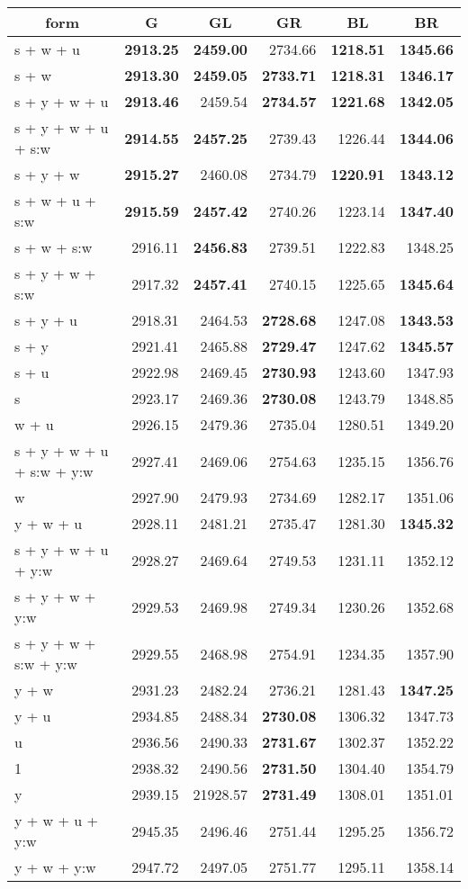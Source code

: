 %
\begin{table}[!tbp]
\begin{center}
\begin{tabular}{lrrrrr}
\hline\hline
\multicolumn{1}{c}{form}&\multicolumn{1}{c}{G}&\multicolumn{1}{c}{GL}&\multicolumn{1}{c}{GR}&\multicolumn{1}{c}{BL}&\multicolumn{1}{c}{BR}\tabularnewline
\hline
    s + w + u&\bf   2913.25&\bf    2459.00&   2734.66&\bf   1218.51&\bf   1345.66\tabularnewline
    s + w&\bf   2913.30&\bf    2459.05&\bf   2733.71&\bf   1218.31&\bf   1346.17\tabularnewline
    s + y + w + u&\bf   2913.46&    2459.54&\bf   2734.57&\bf   1221.68&\bf   1342.05\tabularnewline
    s + y + w + u + s:w&\bf   2914.55&\bf    2457.25&   2739.43&   1226.44&\bf   1344.06\tabularnewline
    s + y + w&\bf   2915.27&    2460.08&   2734.79&\bf   1220.91&\bf   1343.12\tabularnewline
    s + w + u + s:w&\bf   2915.59&\bf    2457.42&   2740.26&   1223.14&\bf   1347.40\tabularnewline
    s + w + s:w&   2916.11&\bf    2456.83&   2739.51&   1222.83&   1348.25\tabularnewline
    s + y + w + s:w&   2917.32&\bf    2457.41&   2740.15&   1225.65&\bf   1345.64\tabularnewline
    s + y + u&   2918.31&    2464.53&\bf   2728.68&   1247.08&\bf   1343.53\tabularnewline
    s + y&   2921.41&    2465.88&\bf   2729.47&   1247.62&\bf   1345.57\tabularnewline
    s + u&   2922.98&    2469.45&\bf   2730.93&   1243.60&   1347.93\tabularnewline
    s&   2923.17&    2469.36&\bf   2730.08&   1243.79&   1348.85\tabularnewline
    w + u&   2926.15&    2479.36&   2735.04&   1280.51&   1349.20\tabularnewline
    s + y + w + u + s:w + y:w&   2927.41&    2469.06&   2754.63&   1235.15&   1356.76\tabularnewline
    w&   2927.90&    2479.93&   2734.69&   1282.17&   1351.06\tabularnewline
    y + w + u&   2928.11&    2481.21&   2735.47&   1281.30&\bf   1345.32\tabularnewline
    s + y + w + u + y:w&   2928.27&    2469.64&   2749.53&   1231.11&   1352.12\tabularnewline
    s + y + w + y:w&   2929.53&    2469.98&   2749.34&   1230.26&   1352.68\tabularnewline
    s + y + w + s:w + y:w&   2929.55&    2468.98&   2754.91&   1234.35&   1357.90\tabularnewline
    y + w&   2931.23&    2482.24&   2736.21&   1281.43&\bf   1347.25\tabularnewline
    y + u&   2934.85&    2488.34&\bf   2730.08&   1306.32&   1347.73\tabularnewline
    u&   2936.56&    2490.33&\bf   2731.67&   1302.37&   1352.22\tabularnewline
    1&   2938.32&    2490.56&\bf   2731.50&   1304.40&   1354.79\tabularnewline
    y&   2939.15&   21928.57&\bf   2731.49&   1308.01&   1351.01\tabularnewline
    y + w + u + y:w&   2945.35&    2496.46&   2751.44&   1295.25&   1356.72\tabularnewline
    y + w + y:w&   2947.72&    2497.05&   2751.77&   1295.11&   1358.14\tabularnewline
\hline
\end{tabular}
\end{center}
\end{table}

